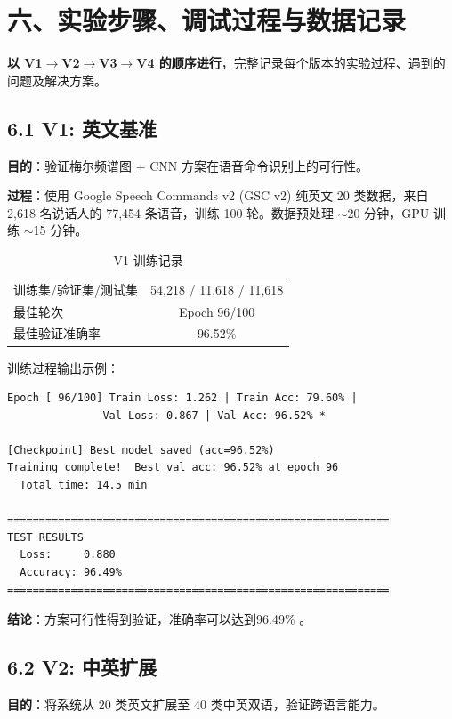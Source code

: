 ﻿\documentclass[12pt,a4paper]{article}
\begin{document}
\section*{六、实验步骤、调试过程与数据记录}

\textbf{以 V1$\to$V2$\to$V3$\to$V4 的顺序进行}，完整记录每个版本的实验过程、遇到的问题及解决方案。

\subsection*{6.1 V1: 英文基准}

\textbf{目的}：验证梅尔频谱图 + CNN 方案在语音命令识别上的可行性。

\textbf{过程}：使用 Google Speech Commands v2 (GSC v2) 纯英文 20 类数据，来自 2,618 名说话人的 77,454 条语音，训练 100 轮。数据预处理 $\sim$20 分钟，GPU 训练 $\sim$15 分钟。

\begin{table}[H]\centering\caption{V1 训练记录}\label{tab:v1train}
\begin{tabular}{l|c}\toprule
训练集/验证集/测试集&54,218 / 11,618 / 11,618\\
最佳轮次&Epoch 96/100\\
最佳验证准确率&96.52\%\\\bottomrule
\end{tabular}
\end{table}

训练过程输出示例：

\begin{verbatim}
Epoch [ 96/100] Train Loss: 1.262 | Train Acc: 79.60% |
               Val Loss: 0.867 | Val Acc: 96.52% *

[Checkpoint] Best model saved (acc=96.52%)
Training complete!  Best val acc: 96.52% at epoch 96
  Total time: 14.5 min

============================================================
TEST RESULTS
  Loss:     0.880
  Accuracy: 96.49%
============================================================
\end{verbatim}

\textbf{结论}：方案可行性得到验证，准确率可以达到96.49\% 。

\subsection*{6.2 V2: 中英扩展}

\textbf{目的}：将系统从 20 类英文扩展至 40 类中英双语，验证跨语言能力。
\end{document}
